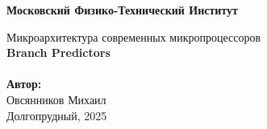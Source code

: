 \newcommand{\HRule}{\rule{\linewidth}{0.7mm}}

\begin{center}
	\large\textbf{Московский Физико-Технический Институт}\\
	\vfill
		
	\Large Микроархитектура современных микропроцессоров
	\\[0.4cm]
	{ \huge \bfseries Branch Predictors}
	\\[0.4cm]
	
	\ \\
	\textbf{\large Автор:} \\	
	\large Овсянников Михаил\\
	\vfill
	\large Долгопрудный, 2025
\end{center}

\thispagestyle{empty}

\newpage
\setcounter{page}{2}
